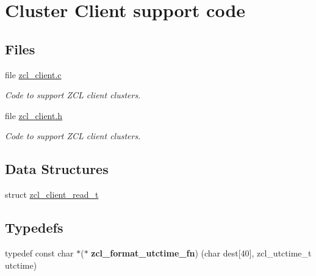 \hypertarget{group__zcl__client}{}\section{Cluster Client support code}
\label{group__zcl__client}
\subsection*{Files}
\begin{DoxyCompactItemize}
\item 
file \hyperlink{zcl__client_8c}{zcl\+\_\+client.\+c}
\begin{DoxyCompactList}\small\item\em Code to support Z\+CL client clusters. \end{DoxyCompactList}\item 
file \hyperlink{zcl__client_8h}{zcl\+\_\+client.\+h}
\begin{DoxyCompactList}\small\item\em Code to support Z\+CL client clusters. \end{DoxyCompactList}\end{DoxyCompactItemize}
\subsection*{Data Structures}
\begin{DoxyCompactItemize}
\item 
struct \hyperlink{structzcl__client__read__t}{zcl\+\_\+client\+\_\+read\+\_\+t}
\end{DoxyCompactItemize}
\subsection*{Typedefs}
\begin{DoxyCompactItemize}
\item 
\mbox{\label{group__zcl__client_gacf0aecf1ecf13d497498beef8c496dde}} 
typedef const char $\ast$($\ast$ {\bfseries zcl\+\_\+format\+\_\+utctime\+\_\+fn}) (char dest\mbox{[}40\mbox{]}, zcl\+\_\+utctime\+\_\+t utctime)
\end{DoxyCompactItemize}
